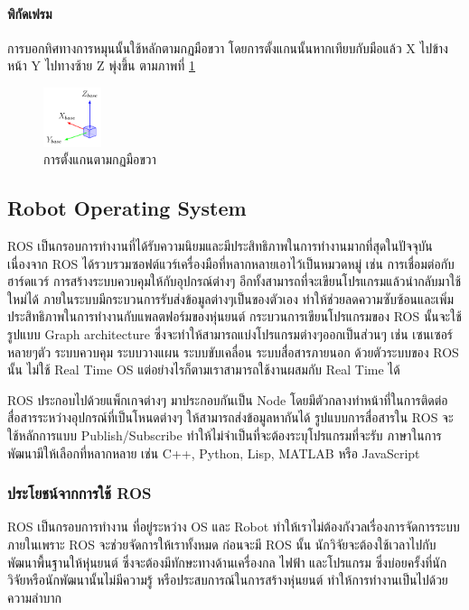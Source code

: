 \paragraph*{พิกัดเฟรม}
การบอกทิศทางการหมุนนั้นใช้หลักตามกฏมือขวา โดยการตั้งแกนนั้นหากเทียบกับมือแล้ว X ไปข้างหน้า Y ไปทางซ้าย Z พุ่งขึ้น ตามภาพที่ \ref{fig:right_hand_rule}
\begin{figure}[!ht]
	\centering
	\includegraphics[width=0.15\textwidth]{chapter2/images/right_hand_rule.png}
	\caption{การตั้งแกนตามกฏมือขวา}
	\label{fig:right_hand_rule}
\end{figure}

\subsection{Robot Operating System}
ROS เป็นกรอบการทำงานที่ได้รับความนิยมและมีประสิทธิภาพในการทำงานมากที่สุดในปัจจุบัน เนื่องจาก ROS
ได้รวบรวมซอฟต์แวร์เครื่องมือที่หลากหลายเอาไว้เป็นหมวดหมู่ เช่น การเชื่อมต่อกับฮาร์ดแวร์
การสร้างระบบควบคุมให้กับอุปกรณ์ต่างๆ อีกทั้งสามารถที่จะเขียนโปรแกรมแล้วนำกลับมาใช้ใหม่ได้
ภายในระบบมีกระบวนการรับส่งข้อมูลต่างๆเป็นของตัวเอง ทำให้ช่วยลดความซับซ้อนและเพิ่มประสิทธิภาพในการทำงานกับแพลตฟอร์มของหุ่นยนต์
กระบวนการเขียนโปรแกรมของ ROS นั้นจะใช้รูปแบบ Graph architecture ซึ่งจะทำให้สามารถแบ่งโปรแกรมต่างๆออกเป็นส่วนๆ เช่น
เซนเซอร์หลายๆตัว ระบบควบคุม ระบบวางแผน ระบบขับเคลื่อน ระบบสื่อสารภายนอก ด้วยตัวระบบของ ROS นั้น ไม่ใช้ Real Time OS
แต่อย่างไรก็ตามเราสามารถใช้งานผสมกับ Real Time ได้

ROS ประกอบไปด้วยแพ็กเกจต่างๆ มาประกอบกันเป็น Node โดยมีตัวกลางทำหน้าที่ในการติดต่อสื่อสารระหว่างอุปกรณ์ที่เป็นโหนดต่างๆ
ให้สามารถส่งข้อมูลหากันได้ รูปแบบการสื่อสารใน ROS จะใช้หลักการแบบ Publish/Subscribe ทำให้ไม่จำเป็นที่จะต้องระบุโปรแกรมที่จะรับ
ภาษาในการพัฒนามีให้เลือกที่หลากหลาย เช่น C++, Python, Lisp, MATLAB หรือ JavaScript 

\subsubsection*{ประโยชน์จากการใช้ ROS}
ROS เป็นกรอบการทำงาน ที่อยู่ระหว่าง OS และ Robot ทำให้เราไม่ต้องกังวลเรื่องการจัดการระบบภายในเพราะ
ROS จะช่วยจัดการให้เราทั้งหมด ก่อนจะมี ROS นั้น นักวิจัยจะต้องใช้เวลาไปกับพัฒนาพื้นฐานให้หุ่นยนต์
ซึ่งจะต้องมีทักษะทางด้านเครื่องกล ไฟฟ้า และโปรแกรม ซึ่งบ่อยครั้งที่นักวิจัยหรือนักพัฒนานั้นไม่มีความรู้
หรือประสบการณ์ในการสร้างหุ่นยนต์ ทำให้การทำงานเป็นไปด้วยความลำบาก